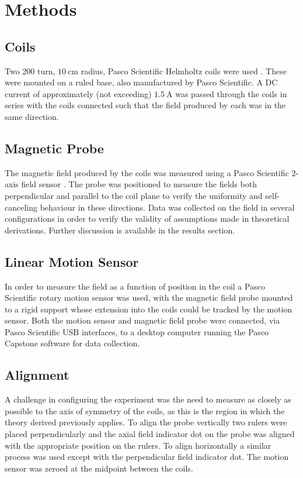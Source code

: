 \documentclass[10pt, twocolumn]{article}
\theoremstyle{definition}
\begin{document}
\section{Methods}
\subsection{Coils}
Two 200 turn, $\qty{10}{\centi\meter}$ radius, Pasco Scientific Helmholtz coils were used \cite{pascoHelmholtzCoils}. These were mounted on a ruled base, also manufactured by Pasco Scientific. A DC current of approximately (not exceeding) $\qty{1.5}{\ampere}$ was passed through the coils in series with the coils connected such that the field produced by each was in the same direction.
\subsection{Magnetic Probe}
The magnetic field produced by the coils was measured using a Pasco Scientific 2-axis field sensor \cite{pascoPASPORT2Axis}. The probe was positioned to measure the fields both perpendicular and parallel to the coil plane to verify the uniformity and self-canceling behaviour in these directions.
Data was collected on the field in several configurations in order to verify the validity of assumptions made in theoretical derivations. Further discussion is available in the results section.
\subsection{Linear Motion Sensor}
In order to measure the field as a function of position in the coil a Pasco Scientific rotary motion sensor \cite{pascoPASPORTRotary} was used, with the magnetic field probe mounted to a rigid support whose extension into the coils could be tracked by the motion sensor.  Both the motion sensor and magnetic field probe were connected, via Pasco Scientific USB interfaces, to a desktop computer running the Pasco Capstone software for data collection.
\subsection{Alignment}
A challenge in configuring the experiment was the need to measure as closely as possible to 
the axis of symmetry of the coils, as this is the region in which the theory derived previously applies. To align the probe vertically two rulers were placed perpendicularly and the axial field indicator dot on the probe was aligned with the appropriate position on the rulers. To align horizontally a similar process was used except with the perpendicular field indicator dot. The motion sensor was zeroed at the midpoint between the coils. 
\end{document}
